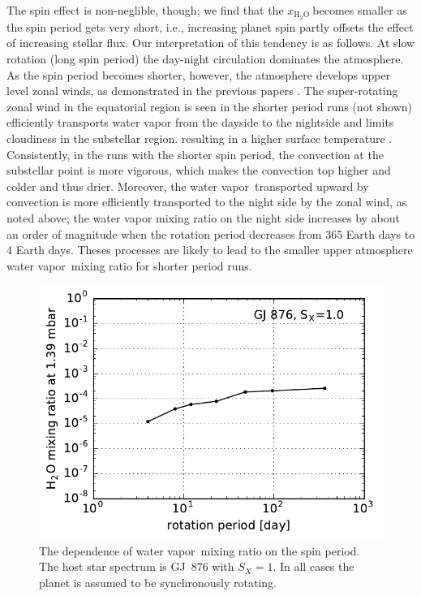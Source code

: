 \documentclass[11pt,numberedappendix,twocolappendix,]{emulateapj}
\def\water{H$_2$O }
\def\xwater{$x_\text{\water}$}
\newcommand{\yf}[1]{{\color{orange}#1}}
\newcommand{\wv}{water vapor\ }
\begin{document}
\yf{The spin effect is non-neglible, though;} we find that the \xwater becomes smaller as the spin period gets very short\yf{, i.e., increasing planet spin partly offsets the effect of increasing stellar flux.}  %
Our interpretation of this tendency is as follows. 
\yf{At} slow rotation (long spin period) the day-night circulation dominates the atmosphere. 
As the spin period becomes shorter, however, the atmosphere develops upper level zonal winds, as demonstrated in the previous papers \citep{Merlis2010, Edson2011, Kopparapu2016}. 
%
The super-rotating zonal wind in the equatorial region is seen in the shorter period runs (not shown) efficiently \yf{transports water vapor from the dayside to the nightside and limits cloudiness in the substellar region}.
resulting in a higher surface temperature \citep{Kopparapu2016}.  
Consistently, in the runs with the shorter spin period, the convection at the substellar point is more vigorous, which makes the convection top higher and colder and \yf{thus drier}. 
Moreover, the \wv transported upward by convection is \yf{more} efficiently transported to the night side by the zonal wind, \yf{as noted above}; the water vapor mixing ratio \yf{on} the night side increases by about an order of magnitude when the rotation period decreases from 365 Earth days to 4 Earth days. 
Theses processes are likely to lead to the smaller upper atmosphere \wv mixing ratio for shorter period runs. 


\begin{figure}[!h]
    \begin{center}
    \includegraphics[width=\hsize]{fig/xH2O_Prot.pdf}
    \end{center}
\caption{The dependence of \wv mixing ratio on the spin period. The host star spectrum is GJ~876 with $S_X=1$. In all cases the planet is assumed to be synchronously rotating. }
\label{fig:changeP}
\end{figure}
\end{document}
